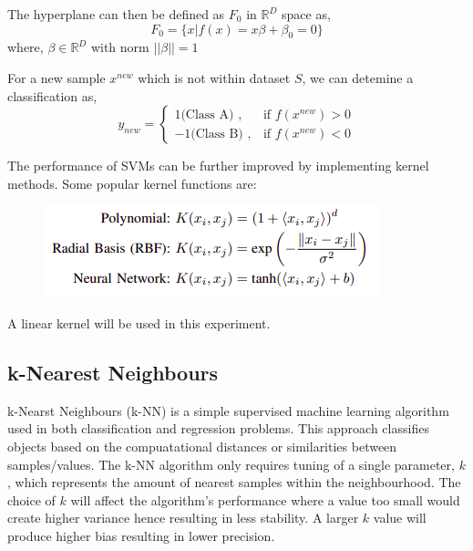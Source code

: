 \documentclass[a4paper,12pt]{report}
\newcommand{\R}{\mathbb{R}}
\begin{document}
The hyperplane can then be defined as $F_0$ in $\R^D$ space as,
\begin{equation}
    F_0 = \big \{x|f(x) = x \beta + \beta_0 = 0 \big \} 
\end{equation}  
where, 
$\beta \in \R^D$ with norm $||\beta|| = 1$

For a new sample $x^{new}$ which is not within dataset $S$, we can detemine a classification as,
\begin{equation}
    y_{new} = \begin{cases}
        1 \text{(Class A) }, & \text{if } f(x^{new}) > 0 \\
        -1 \text{(Class B) }, & \text{if } f(x^{new}) < 0
    \end{cases}
\end{equation}

The performance of SVMs can be further improved by implementing kernel methods. Some popular kernel functions are:
\begin{figure}[h]
    \includegraphics[scale=0.7]{SVM_kernel.png}
    \centering
    \label{fig:kernel}
\end{figure}

A linear kernel will be used in this experiment.



\subsection{k-Nearest Neighbours}
k-Nearst Neighbours (k-NN) is a simple supervised machine learning algorithm used in both classification and regression problems. 
This approach classifies objects based on the compuatational distances or similarities between samples/values.
The k-NN algorithm only requires tuning of a single parameter, $k$, which represents the amount of nearest samples within the neighbourhood.
The choice of $k$ will affect the algorithm's performance where a value too small would create higher variance hence resulting in less stability.
A larger $k$ value will produce higher bias resulting in lower precision. 
\end{document}
